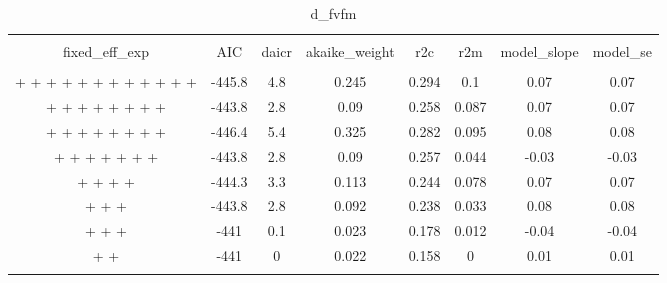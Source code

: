 
\begin{table}[!htbp] \centering 
  \caption{d_fvfm} 
  \label{d_fvfm} 
\begin{tabular}{@{\extracolsep{5pt}} cccccccc} 
\\[-1.8ex]\hline 
\hline \\[-1.8ex] 
fixed\_eff\_exp & AIC & daicr & akaike\_weight & r2c & r2m & model\_slope & model\_se \\ 
\hline \\[-1.8ex] 
 +  +  +  +  +  +  +  +  +  +  +  +  & -445.8 & 4.8 & 0.245 & 0.294 & 0.1 & 0.07 & 0.07 \\ 
 +  +  +  +  +  +  +  +  & -443.8 & 2.8 & 0.09 & 0.258 & 0.087 & 0.07 & 0.07 \\ 
 +  +  +  +  +  +  +  +  & -446.4 & 5.4 & 0.325 & 0.282 & 0.095 & 0.08 & 0.08 \\ 
 +  +  +  +  +  +  +  & -443.8 & 2.8 & 0.09 & 0.257 & 0.044 & -0.03 & -0.03 \\ 
 +  +  +  +  & -444.3 & 3.3 & 0.113 & 0.244 & 0.078 & 0.07 & 0.07 \\ 
 +  +  +  & -443.8 & 2.8 & 0.092 & 0.238 & 0.033 & 0.08 & 0.08 \\ 
 +  +  +  & -441 & 0.1 & 0.023 & 0.178 & 0.012 & -0.04 & -0.04 \\ 
 +  +  & -441 & 0 & 0.022 & 0.158 & 0 & 0.01 & 0.01 \\ 
\hline \\[-1.8ex] 
\end{tabular} 
\end{table} 
